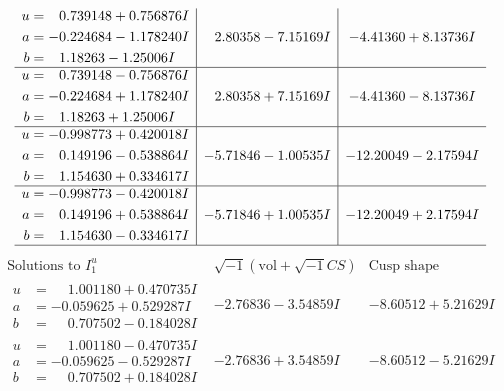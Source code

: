 \documentclass[1p]{elsarticle_modified}
\theoremstyle{definition}
\newcommand{\I}{\sqrt{-1}}
\begin{document}
$$\begin{array}{c|c|c}
\begin{aligned}
u &= \phantom{-}0.739148 + 0.756876 I \\
a &= -0.224684 - 1.178240 I \\
b &= \phantom{-}1.18263 - 1.25006 I\end{aligned}
 & \phantom{-}2.80358 - 7.15169 I & -4.41360 + 8.13736 I \\ \hline\begin{aligned}
u &= \phantom{-}0.739148 - 0.756876 I \\
a &= -0.224684 + 1.178240 I \\
b &= \phantom{-}1.18263 + 1.25006 I\end{aligned}
 & \phantom{-}2.80358 + 7.15169 I & -4.41360 - 8.13736 I \\ \hline\begin{aligned}
u &= -0.998773 + 0.420018 I \\
a &= \phantom{-}0.149196 - 0.538864 I \\
b &= \phantom{-}1.154630 + 0.334617 I\end{aligned}
 & -5.71846 - 1.00535 I & -12.20049 - 2.17594 I \\ \hline\begin{aligned}
u &= -0.998773 - 0.420018 I \\
a &= \phantom{-}0.149196 + 0.538864 I \\
b &= \phantom{-}1.154630 - 0.334617 I\end{aligned}
 & -5.71846 + 1.00535 I & -12.20049 + 2.17594 I\\
 \hline 
 \end{array}$$\newpage$$\begin{array}{c|c|c}  
\text{Solutions to }I^u_{1}& \I (\text{vol} + \sqrt{-1}CS) & \text{Cusp shape}\\
 \hline 
\begin{aligned}
u &= \phantom{-}1.001180 + 0.470735 I \\
a &= -0.059625 + 0.529287 I \\
b &= \phantom{-}0.707502 - 0.184028 I\end{aligned}
 & -2.76836 - 3.54859 I & -8.60512 + 5.21629 I \\ \hline\begin{aligned}
u &= \phantom{-}1.001180 - 0.470735 I \\
a &= -0.059625 - 0.529287 I \\
b &= \phantom{-}0.707502 + 0.184028 I\end{aligned}
 & -2.76836 + 3.54859 I & -8.60512 - 5.21629 I \\ \hline\begin{aligned}

\end{aligned}
\end{array}$$
\end{document}
